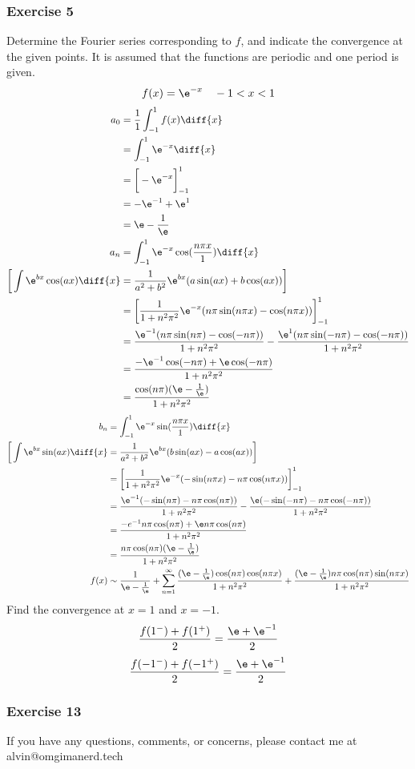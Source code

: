 \documentclass{math}
\begin{document}
\subsubsection*{Exercise 5}
Determine the Fourier series corresponding to \( f \), and indicate the
convergence at the given points. It is assumed that the functions are periodic
and one period is given.
\[ f(x) = \e^{-x} \quad -1<x<1 \]
\begin{align*}
  a_0 &= \frac{1}{1}\int_{-1}^{1}f(x)\diff{x} \\
  &= \int_{-1}^{1}\e^{-x}\diff{x} \\
  &= \bigg[-\e^{-x}\bigg]_{-1}^{1} \\
  &= -\e^{-1}+\e^{1} \\
  &= \e-\frac{1}{\e} \\
  a_n &= \int_{-1}^{1}\e^{-x}\cos(\frac{n\pi x}{1})\diff{x} \\
  \bigg[\int\e^{bx}\cos(ax)\diff{x} &=
    \frac{1}{a^2+b^2}\e^{bx}(a\sin(ax)+b\cos(ax))\bigg] \\
  &= \bigg[\frac{1}{1+n^2\pi^2}\e^{-x}(n\pi\sin(n\pi x)-
    \cos(n\pi x))\bigg]_{-1}^{1} \\
  &= \frac{\e^{-1}(n\pi\sin(n\pi)-\cos(-n\pi))}{1+n^2\pi^2}-
    \frac{\e^{1}(n\pi\sin(-n\pi)-\cos(-n\pi))}{1+n^2\pi^2} \\
  &= \frac{-\e^{-1}\cos(-n\pi)+\e\cos(-n\pi)}{1+n^2\pi^2} \\
  &= \frac{\cos(n\pi)(\e-\frac{1}{\e})}{1+n^2\pi^2}
\end{align*}
\begin{align*}
  b_n &= \int_{-1}^{1}\e^{-x}\sin(\frac{n\pi x}{1})\diff{x} \\
  \bigg[\int\e^{bx}\sin(ax)\diff{x} &=
    \frac{1}{a^2+b^2}\e^{bx}(b\sin(ax)-a\cos(ax))\bigg] \\
  &= \bigg[\frac{1}{1+n^2\pi^2}\e^{-x}(-\sin(n\pi x)-
    n\pi\cos(n\pi x))\bigg]_{-1}^{1} \\
  &= \frac{\e^{-1}(-\sin(n\pi)-n\pi\cos(n\pi))}{1+n^2\pi^2}-
    \frac{\e(-\sin(-n\pi)-n\pi\cos(-n\pi))}{1+n^2\pi^2} \\
  &= \frac{-e^{-1}n\pi\cos(n\pi)+\e n\pi\cos(n\pi)}{1+n^2\pi^2} \\
  &= \frac{n\pi\cos(n\pi)(\e-\frac{1}{\e})}{1+n^2\pi^2} \\
  f(x) &\sim \frac{1}{\e-\frac{1}{\e}}+\sum_{n=1}^{\infty}
    \frac{(\e-\frac{1}{\e})\cos(n\pi)\cos(n\pi x)}{1+n^2\pi^2}+
    \frac{(\e-\frac{1}{\e})n\pi\cos(n\pi)\sin(n\pi x)}{1+n^2\pi^2}
\end{align*}
Find the convergence at \( x = 1 \) and \( x = -1 \).
\[ \frac{f(1^-)+f(1^+)}{2} = \frac{\e+\e^{-1}}{2} \]
\[ \frac{f(-1^-)+f(-1^+)}{2} = \frac{\e+\e^{-1}}{2} \]

\subsubsection*{Exercise 13}

\begin{center}
  If you have any questions, comments, or concerns, please contact me at
  alvin@omgimanerd.tech
\end{center}
\end{document}
